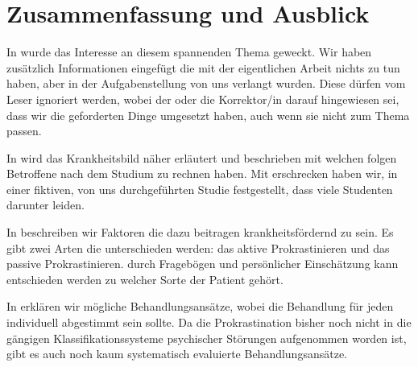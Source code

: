 \chapter{Zusammenfassung und Ausblick}
\label{cha:zusammenfassung}
		
In  wurde das Interesse an diesem spannenden Thema geweckt. Wir haben zusätzlich Informationen eingefügt die mit der eigentlichen Arbeit nichts zu tun haben, aber in der Aufgabenstellung von uns verlangt wurden. Diese dürfen vom Leser ignoriert werden, wobei der oder die Korrektor/in darauf hingewiesen sei, dass wir die geforderten Dinge umgesetzt haben, auch wenn sie nicht zum Thema passen.

In  wird das Krankheitsbild näher erläutert und beschrieben mit welchen folgen Betroffene nach dem Studium zu rechnen haben. Mit erschrecken haben wir, in einer fiktiven, von uns durchgeführten Studie festgestellt, dass viele Studenten darunter leiden.

In  beschreiben wir Faktoren die dazu beitragen krankheitsfördernd zu sein. Es gibt zwei Arten die unterschieden werden: das aktive Prokrastinieren und das passive Prokrastinieren. durch Fragebögen und persönlicher Einschätzung kann entschieden werden zu welcher Sorte der Patient gehört.

In  erklären wir mögliche Behandlungsansätze, wobei die Behandlung für jeden individuell abgestimmt sein sollte. Da die Prokrastination bisher noch nicht in die gängigen Klassifikationssysteme psychischer
Störungen aufgenommen worden ist, gibt es auch noch kaum systematisch evaluierte Behandlungsansätze. 


